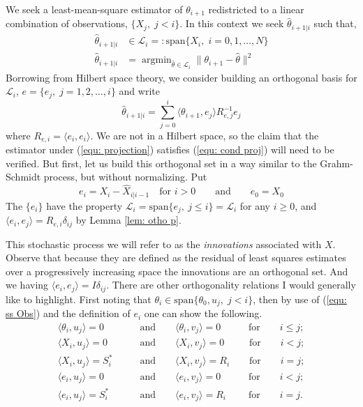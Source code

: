 \documentclass[12pt]{amsart}
\renewcommand{\and}{\qquad\text{and}\qquad}
\DeclareMathOperator*{\argmin}{argmin}
\renewcommand{\and}{\qquad\text{and}\qquad }
\begin{document}
We seek a least-mean-square estimator of $\theta_{i+1}$ redistricted to a linear combination of observations, $\{X_j,\;j < i\}$. In this context we seek $\hat\theta_{i+1|i}$ such that,
\begin{align}
	\hat\theta_{i+1|i} &\in\mathcal{L}_i =: \text{span}\{X_i,\;i=0,1,\dots,N\}\\
	\label{equ: cond proj}\hat\theta_{i+1|i} &= \displaystyle\argmin_{\hat\theta \in \mathcal{L}_i}\|\theta_{i+1} - \hat\theta\|^2
\end{align}
Borrowing from Hilbert space theory, we consider building an orthogonal basis for $\mathcal{L}_i$, $e = \{e_j,\;j = 1,2,\dots,i\}$ and write 
\begin{equation}
\hat{\theta}_{i+1|i} = \sum_{j=0}^i \langle \theta_{i+1}, e_j \rangle R^{-1}_{e,j} e_j\label{equ: projection}
\end{equation}
where $R_{e,i} = \langle e_i, e_i \rangle$. We are not in a Hilbert space, so the claim that the estimator under (\ref{equ: projection}) satisfies (\ref{equ: cond proj}) will need to be verified. But first, let us build this orthogonal set in a way similar to the Grahm-Schmidt process, but without normalizing. Put
$$e_i = X_i - \hat{X}_{i|i-1}\quad \text{for }i>0\qquad\text{and}\qquad e_0 = X_0$$
The $\{e_i\}$ have the property $\mathcal{L}_i = \text{span}\{e_j,~j\le i\}=\mathcal{L}_i$ for any $i\ge 0$, and $\langle e_i,e_j \rangle = R_{e,i}\delta_{ij}$ by Lemma \ref{lem: otho p}.




\vspace{3cm}

This stochastic process we will refer to as the \textit{innovations} associated with $X$. Observe that because they are defined as the residual of least squares estimates over a progressively increasing space  the innovations are an orthogonal set. And we having $\langle e_i,e_j \rangle = I\delta_{ij}$. There are other orthogonality relations I would generally like to highlight. First noting that $\theta_i \in \text{span}\{\theta_0, u_j,\; j<i\}$, then by use of (\ref{equ: ss Obs}) and the definition of $e_i$ one can show the following.
\begin{subequations}
	\label{equ: inner p}
\begin{align}
\langle \theta_i, u_j \rangle = 0 &\and \langle \theta_i, v_j \rangle = 0 \qquad\;\;\;\text{for}\qquad i\le j;\\
\label{equ: inner p b}\langle X_i, u_j \rangle = 0 &\and \langle X_i, v_j \rangle = 0 \qquad\;\;\text{for}\qquad i < j;\\
\langle X_i, u_j \rangle = S^*_i &\and \langle X_i, v_j \rangle = R_i \qquad\text{for}\qquad i = j;\\ 
\langle e_i, u_j \rangle = 0 &\and \langle e_i, v_j \rangle = 0 \qquad\;\;\;\text{for}\qquad i < j;\\
\langle e_i, u_j \rangle = S^*_i &\and \langle e_i, v_j \rangle = R_i \qquad\;\text{for}\qquad i = j.
\end{align}
\end{subequations}
\end{document}
